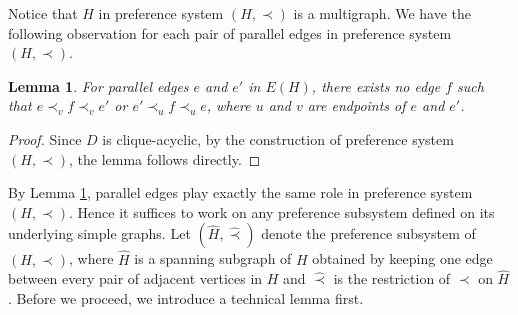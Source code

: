 \documentclass[11pt]{article}
\newtheorem{lemma}[theorem]{Lemma}
\numberwithin{theorem}{section}
\begin{document}
Notice that $H$ in preference system $(H,\prec)$ is a multigraph. We have the following observation for each pair of parallel edges in preference system $(H,\prec)$.

\begin{lemma}
\label{lem:reduct1}
For parallel edges $e$ and $e'$ in $E(H)$, there exists no edge $f$ such that $e\prec_v f \prec_v e'$ or $e'\prec_u f\prec_u e$, where $u$ and $v$ are endpoints of $e$ and $e'$.
\end{lemma}
\begin{proof}
Since $D$ is clique-acyclic, by the construction of preference system $(H,\prec)$, the lemma follows directly.
\end{proof}

By Lemma \ref{lem:reduct1}, parallel edges play exactly the same role in preference system $(H,\prec)$. Hence it suffices to work on any preference subsystem defined on its underlying simple graphs. Let $(\hat{H},\hat\prec)$ denote the preference subsystem of $(H,\prec)$, where $\hat{H}$ is a spanning subgraph of $H$ obtained by keeping one edge between every pair of adjacent vertices in $H$ and $\hat\prec$ is the restriction of $\prec$ on $\hat{H}$. Before we proceed, we introduce a technical lemma first.
\end{document}
